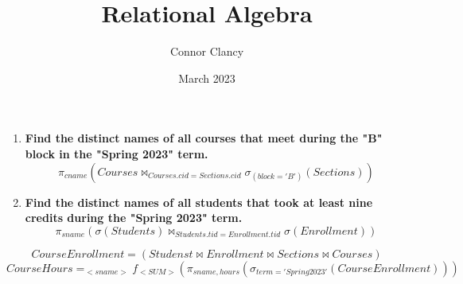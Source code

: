 \documentclass{article}
\title{Relational Algebra}
\author{Connor Clancy}
\date{March 2023}
\begin{document}
\maketitle

\begin{enumerate}
    \item \textbf{Find the distinct names of all courses that meet during the "B" block in the "Spring 2023" term.} \[\pi_{cname}(Courses \bowtie_{Courses.cid = Sections.cid} \sigma_{(block = 'B')}(Sections))\]

    \item \textbf{Find the distinct names of all students that took at least nine credits during the "Spring 2023" term.} \[\pi_{sname}(\sigma(Students) \bowtie_{Students.tid = Enrollment.tid} \sigma(Enrollment))\]
\end{enumerate}

\[CourseEnrollment = (Studenst \bowtie Enrollment \bowtie Sections \bowtie Courses) \]
\[CourseHours = _{<sname>} f _{<SUM>} (\pi_{sname, hours} (\sigma_{term = 'Spring 2023'}(CourseEnrollment)))\]
\end{document}
